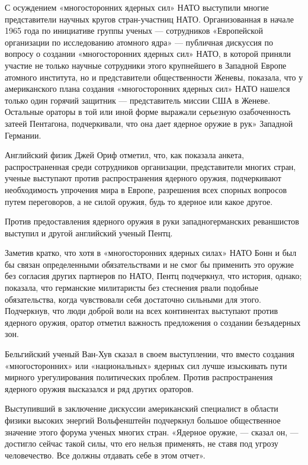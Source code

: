\documentclass[12pt, a4paper, openany]{book}
\begin{document}
	С осуждением «многосторонних ядерных сил» НАТО выступили многие представители научных кругов стран-участниц НАТО. Организованная в начале 1965 года по инициативе группы ученых — сотрудников «Европейской организации по исследованию атомного ядра» — публичная дискуссия по вопросу о создании «многосторонних ядерных сил» НАТО, в которой приняли участие не только научные сотрудники этого крупнейшего в Западной Европе атомного института, но и представители общественности Женевы, показала, что у американского плана создания «многосторонних ядерных сил» НАТО нашелся только один горячий защитник — представитель миссии США в Женеве. Остальные ораторы в той или иной форме выражали серьезную озабоченность затеей Пентагона, подчеркивали, что она дает ядерное оружие в рук» Западной Германии.
	
	Английский физик Джей Ориф отметил, что, как показала анкета, распространенная среди сотрудников организации, представители многих стран, ученые выступают против распространения ядерного оружия, подчеркивают необходимость упрочения мира в Европе, разрешения всех спорных вопросов путем переговоров, а не силой оружия, будь то ядерное или какое другое.
	
	Против предоставления ядерного оружия в руки западногерманских реваншистов выступил и другой английский ученый Пентц.
	
	Заметив кратко, что хотя в «многосторонних ядерных силах» НАТО Бонн и был бы связан определенными обязательствами и не смог бы применить это оружие без согласия других партнеров по НАТО, Пентц подчеркнул, что история, однако; показала, что германские милитаристы без стеснения рвали подобные обязательства, когда чувствовали себя достаточно сильными для этого. Подчеркнув, что люди доброй воли на всех континентах выступают против ядерного оружия, оратор отметил важность предложения о создании безъядерных зон.
	
	Бельгийский ученый Ван-Хув сказал в своем выступлении, что вместо создания «многосторонних» или «национальных» ядерных сил лучше изыскивать пути мирного урегулирования политических проблем. Против распространения ядерного оружия высказался и ряд других ораторов.
	
	Выступивший в заключение дискуссии американский специалист в области физики высоких энергий Вольфенштейн подчеркнул большое общественное значение этого форума ученых многих стран. «Ядерное оружие, — сказал он, — достигло сейчас такой силы, что его нельзя применять, не ставя под угрозу человечество. Все должны отдавать себе в этом отчет».
	
\end{document}
